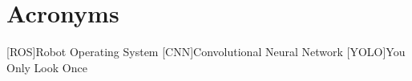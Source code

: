 \chapter*{Acronyms}
	\begin{acronym}[RELAX NG]
	[ROS]{Robot Operating System}
	[CNN]{Convolutional Neural Network}
	[YOLO]{You Only Look Once}
	
	\end{acronym}
